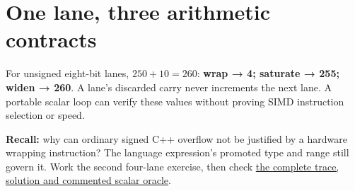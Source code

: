\section{One lane, three arithmetic contracts}\label{appendix-2587680a4fe3-one-lane-three-arithmetic-contracts}

For unsigned eight-bit lanes, \(250+10=260\): \textbf{wrap → 4; saturate → 255; widen → 260}. A lane's discarded carry never increments the next lane. A portable scalar loop can verify these values without proving SIMD instruction selection or speed.

\textbf{Recall:} why can ordinary signed C++ overflow not be justified by a hardware wrapping instruction? The language expression's promoted type and range still govern it. Work the second four-lane exercise, then check \href{Continuous\%20Notes/Computing\%20Foundations\%20-\%20From\%20Bits\%20to\%20C++\%20and\%20Systems\%20APIs\#Three\%20lane-arithmetic\%20contracts:\%20wrap,\%20saturate\%20and\%20widen}{the complete trace, solution and commented scalar oracle}.
